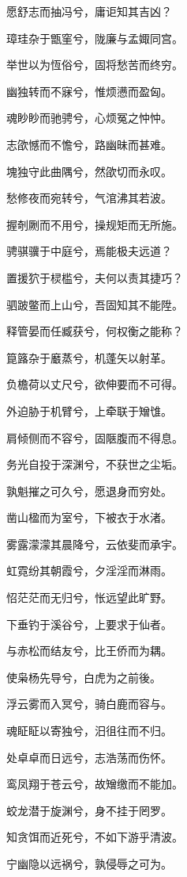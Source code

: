 \documentclass[UTF8,titlepage,oneside]{ctexbook}
\begin{document}
\begin{center}
    愿舒志而抽冯兮，庸讵知其吉凶？
    
    璋珪杂于甑窐兮，陇廉与孟娵同宫。
    
    举世以为恆俗兮，固将愁苦而终穷。
    
    幽独转而不寐兮，惟烦懑而盈匈。
    
    魂眇眇而驰骋兮，心烦冤之忡忡。
    
    志欿憾而不憺兮，路幽昧而甚难。
    
    塊独守此曲隅兮，然欿切而永叹。
    
    愁修夜而宛转兮，气涫沸其若波。
    
    握剞劂而不用兮，操规矩而无所施。
    
    骋骐骥于中庭兮，焉能极夫远道？
    
    置援狖于棂槛兮，夫何以责其捷巧？
    
    驷跛鳖而上山兮，吾固知其不能陞。
    
    释管晏而任臧获兮，何权衡之能称？
    
    箟簬杂于黀蒸兮，机蓬矢以射革。
    
    负檐荷以丈尺兮，欲伸要而不可得。
    
    外迫胁于机臂兮，上牵联于矰隿。
    
    肩倾侧而不容兮，固陿腹而不得息。
    
    务光自投于深渊兮，不获世之尘垢。
    
    孰魁摧之可久兮，愿退身而穷处。
    
    凿山楹而为室兮，下被衣于水渚。
    
    雾露濛濛其晨降兮，云依斐而承宇。
    
    虹霓纷其朝霞兮，夕淫淫而淋雨。
    
    怊茫茫而无归兮，怅远望此旷野。
    
    下垂钓于溪谷兮，上要求于仙者。
    
    与赤松而结友兮，比王侨而为耦。
    
    使枭杨先导兮，白虎为之前後。
    
    浮云雾而入冥兮，骑白鹿而容与。
    
    魂眐眐以寄独兮，汨徂往而不归。
    
    处卓卓而日远兮，志浩荡而伤怀。
    
    鸾凤翔于苍云兮，故矰缴而不能加。
    
    蛟龙潜于旋渊兮，身不挂于罔罗。
    
    知贪饵而近死兮，不如下游乎清波。
    
    宁幽隐以远祸兮，孰侵辱之可为。
    

\end{center}
\end{document}
